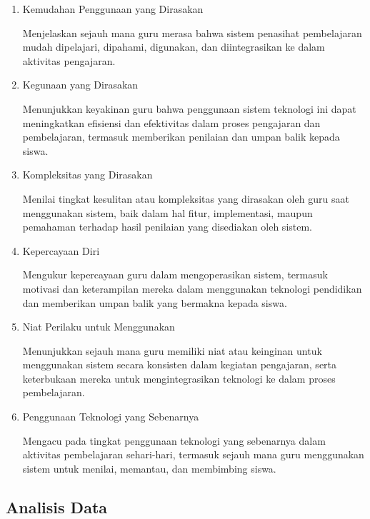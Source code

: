     \begin{enumerate}
        \item Kemudahan Penggunaan yang Dirasakan
        
        Menjelaskan sejauh mana guru merasa bahwa sistem penasihat pembelajaran mudah dipelajari, dipahami, digunakan, dan diintegrasikan ke dalam aktivitas pengajaran.
        
        \item Kegunaan yang Dirasakan
        
        Menunjukkan keyakinan guru bahwa penggunaan sistem teknologi ini dapat meningkatkan efisiensi dan efektivitas dalam proses pengajaran dan pembelajaran, termasuk memberikan penilaian dan umpan balik kepada siswa.
        
        \item Kompleksitas yang Dirasakan
        
        Menilai tingkat kesulitan atau kompleksitas yang dirasakan oleh guru saat menggunakan sistem, baik dalam hal fitur, implementasi, maupun pemahaman terhadap hasil penilaian yang disediakan oleh sistem.
        
        \item Kepercayaan Diri
        
        Mengukur kepercayaan guru dalam mengoperasikan sistem, termasuk motivasi dan keterampilan mereka dalam menggunakan teknologi pendidikan dan memberikan umpan balik yang bermakna kepada siswa.
        
        \item Niat Perilaku untuk Menggunakan
        
        Menunjukkan sejauh mana guru memiliki niat atau keinginan untuk menggunakan sistem secara konsisten dalam kegiatan pengajaran, serta keterbukaan mereka untuk mengintegrasikan teknologi ke dalam proses pembelajaran.
        
        \item Penggunaan Teknologi yang Sebenarnya
        
        Mengacu pada tingkat penggunaan teknologi yang sebenarnya dalam aktivitas pembelajaran sehari-hari, termasuk sejauh mana guru menggunakan sistem untuk menilai, memantau, dan membimbing siswa.
    \end{enumerate}

\subsection{Analisis Data}

